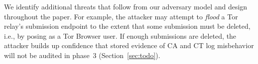 %
%
We identify additional threats that follow from our adversary model and
design throughout the paper.  For example, the attacker may attempt to
\emph{flood} a Tor relay's submission endpoint to the extent that some
submission must be deleted, i.e., by posing as a Tor Browser user.  If enough
submissions are deleted, the attacker builds up confidence that stored evidence
of CA and CT log misbehavior will not be audited in phase~3
(Section~\ref{sec:todo}).
